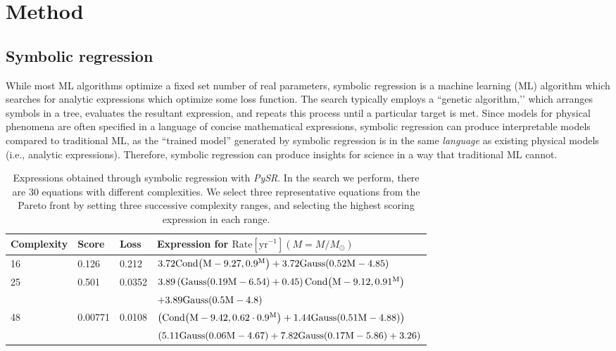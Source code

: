 \documentclass[nohyperref]{article}
\newcommand\pysr{\textit{PySR}\xspace}
\theoremstyle{plain}
\theoremstyle{definition}
\theoremstyle{remark}
\begin{document}
\section{Method}
\label{sec:method}

\subsection{Symbolic regression}

While most ML algorithms optimize a fixed set number of real parameters,
symbolic regression is a machine learning (ML) algorithm which searches for analytic expressions which optimize some loss function.
The search typically employs a ``genetic algorithm,’’ which arranges symbols in a tree, evaluates the resultant expression, and repeats this process until a particular target is met.
Since models for physical phenomena are often specified in a language of concise mathematical expressions, symbolic regression can produce interpretable models compared to traditional ML, as the ``trained model'' generated by symbolic regression is in the same \textit{language} as existing physical models (i.e., analytic expressions).
Therefore, symbolic regression can produce insights for science in a way that traditional ML cannot.

\begin{table*}[hbt!]
    \begin{center}
    \begin{tabular}{ l l l l }
    \hline
    \hline
    Complexity &  Score & Loss & Expression for $\text{Rate}[\text{yr}^{-1}](M=M/M_\odot)$\\
    \hline
    \hline
    16 & 0.126   & 0.212  & $3.72 \rm{Cond}{\left(M - 9.27,0.9^{M} \right)} + 3.72 \rm{Gauss}{\left(0.52 M - 4.85 \right)}$\\[0.4em]
    25 & 0.501   & 0.0352 & $3.89 \left(\rm{Gauss}{\left(0.19 M - 6.54 \right)} + 0.45\right) \rm{Cond}{\left(M - 9.12,0.91^{M} \right)}$\\
    & & & $ + 3.89 \rm{Gauss}{\left(0.5 M - 4.8 \right)}$\\[0.4em]
    48 & 0.00771 & 0.0108 & $\left(\rm{Cond}{\left(M - 9.42,0.62 \cdot 0.9^{M} \right)} + 1.44 \rm{Gauss}{\left(0.51 M - 4.88 \right)}\right)$\\
    & & & $\left(5.11 \rm{Gauss}{\left(0.06 M - 4.67 \right)} + 7.82 \rm{Gauss}{\left(0.17 M - 5.86 \right)} + 3.26\right)$\\
    \hline
    \hline
    \end{tabular}
    \caption{Expressions obtained through symbolic regression with \pysr.
    In the search we perform, there are 30 equations with different complexities.
    We select three representative equations from the Pareto front by setting three successive complexity ranges, and selecting the highest scoring expression in each range.}
    \label{tab:equations}
    \end{center}
\end{table*}
\end{document}
